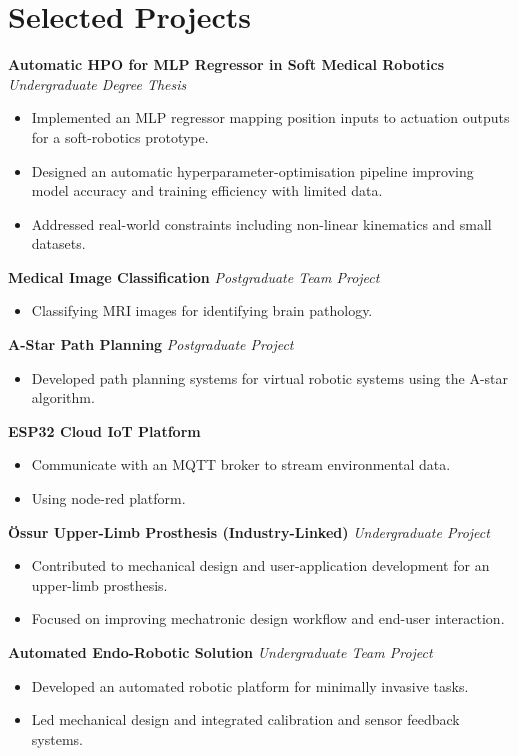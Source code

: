 \documentclass[a4paper,11pt]{article}
\begin{document}
\section*{Selected Projects}

\textbf{Automatic HPO for MLP Regressor in Soft Medical Robotics} \hfill \textit{Undergraduate Degree Thesis}
\begin{itemize}
    \item Implemented an MLP regressor mapping position inputs to actuation outputs for a soft-robotics prototype.
    \item Designed an automatic hyperparameter-optimisation pipeline improving model accuracy and training efficiency with limited data.
    \item Addressed real-world constraints including non-linear kinematics and small datasets.
\end{itemize}

\textbf{Medical Image Classification} \hfill \textit{Postgraduate Team Project}
\begin{itemize}
    \item Classifying MRI images for identifying brain pathology.
\end{itemize}

\textbf{A-Star Path Planning} \hfill \textit{Postgraduate Project}
\begin{itemize}
    \item Developed path planning systems for virtual robotic systems using the A-star algorithm.
\end{itemize}

\textbf{ESP32 Cloud IoT Platform}
\begin{itemize}
    \item Communicate with an MQTT broker to stream environmental data.
    \item Using node-red platform.
\end{itemize}

\textbf{Össur Upper-Limb Prosthesis (Industry-Linked)} \hfill \textit{Undergraduate Project}
\begin{itemize}
    \item Contributed to mechanical design and user-application development for an upper-limb prosthesis.
    \item Focused on improving mechatronic design workflow and end-user interaction.
\end{itemize}

\textbf{Automated Endo-Robotic Solution} \hfill \textit{Undergraduate Team Project}
\begin{itemize}
    \item Developed an automated robotic platform for minimally invasive tasks.
    \item Led mechanical design and integrated calibration and sensor feedback systems.
\end{itemize}
\end{document}
